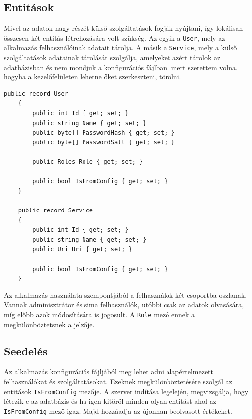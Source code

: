 \subsection{Entitások}
Mivel az adatok nagy részét külső szolgáltatások fogják nyújtani, így lokálisan összesen két entitás létrehozására volt szükség. 
Az egyik a \verb+User+, mely az alkalmazás felhasználóinak adatait tárolja. 
A másik a \verb+Service+, mely a külső szolgáltatások adatainak tárolását szolgálja, amelyeket azért tárolok az adatbázisban és nem mondjuk a konfigurációs fájlban,
mert szerettem volna, hogyha a kezelőfelületen lehetne őket szerkeszteni, törölni.

\begin{lstlisting}[caption=A User és a Service modell]
    public record User
    {
        public int Id { get; set; }
        public string Name { get; set; }
        public byte[] PasswordHash { get; set; }
        public byte[] PasswordSalt { get; set; }

        public Roles Role { get; set; }

        public bool IsFromConfig { get; set; }
    }

    public record Service
    {
        public int Id { get; set; }
        public string Name { get; set; }
        public Uri Uri { get; set; }

        public bool IsFromConfig { get; set; }
    }
\end{lstlisting}

Az alkalmazás használata szempontjából a felhasználók két csoportba oszlanak.
Vannak adminisztrátor és sima felhasználók, utóbbi csak az adatok olvasására, míg előbb azok módosítására is jogosult.
A \verb+Role+ mező ennek a megkülönböztetsnek a jelzője.

\subsection{Seedelés}
\label{subsect:seeding}
Az alkalmazás konfigurációs fájljából meg lehet adni alapértelmezett felhasználókat és szolgáltatásokat.
Ezeknek megkülönböztetésére szolgál az entitások \verb+IsFromConfig+ mezője.
A szerver indítása legelején, megvizsgálja, hogy létezik-e az adatbázis és ha igen kitöröl minden olyan entitást ahol az \verb+IsFromConfig+ mező igaz.
Majd hozzáadja az újonnan beolvasott értékeket.

